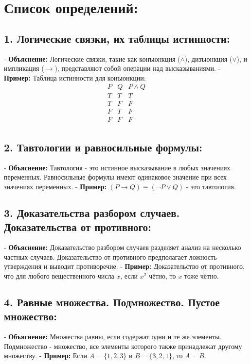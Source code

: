 \documentclass[11pt]{article}
\begin{document}
	
	\section*{Список определений:}
	
	\subsection*{1. Логические связки, их таблицы истинности:}
	- \textbf{Объяснение:} Логические связки, такие как конъюнкция (\(\land\)), дизъюнкция (\(\lor\)), и импликация (\(\rightarrow\)), представляют собой операции над высказываниями.
	- \textbf{Пример:} Таблица истинности для конъюнкции:
	\[
	\begin{array}{ccc}
		P & Q & P \land Q \\
		\hline
		T & T & T \\
		T & F & F \\
		F & T & F \\
		F & F & F \\
	\end{array}
	\]
	
	\subsection*{2. Тавтологии и равносильные формулы:}
	- \textbf{Объяснение:} Тавтология - это истинное высказывание в любых значениях переменных. Равносильные формулы имеют одинаковое значение при всех значениях переменных.
	- \textbf{Пример:} \( (P \rightarrow Q) \equiv (\neg P \lor Q) \) - это тавтология.
	
	\subsection*{3. Доказательства разбором случаев. Доказательства от противного:}
	- \textbf{Объяснение:} Доказательство разбором случаев разделяет анализ на несколько частных случаев. Доказательство от противного предполагает ложность утверждения и выводит противоречие.
	- \textbf{Пример:} Доказательство от противного, что для любого вещественного числа \( x \), если \( x^2 \) чётно, то \( x \) тоже чётно.
	
	\subsection*{4. Равные множества. Подмножество. Пустое множество:}
	- \textbf{Объяснение:} Множества равны, если содержат одни и те же элементы. Подмножество - множество, все элементы которого также принадлежат другому множеству.
	- \textbf{Пример:} Если \( A = \{1, 2, 3\} \) и \( B = \{3, 2, 1\} \), то \( A = B \).
	
\end{document}
